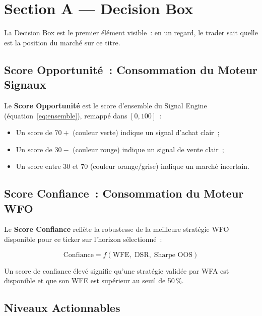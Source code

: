 \section{Section A --- Decision Box}
\label{sec:decision_box}

La Decision Box est le premier élément visible~: en un regard, le trader sait
quelle est la position du marché sur ce titre.

\subsection{Score Opportunité~: Consommation du Moteur Signaux}

Le \textbf{Score Opportunité} est le score d'ensemble du Signal Engine
(équation~\eqref{eq:ensemble}), remappé dans $[0, 100]$~:

\begin{itemize}
    \item Un score de $70+$ (couleur verte) indique un signal d'achat clair~;
    \item Un score de $30-$ (couleur rouge) indique un signal de vente clair~;
    \item Un score entre 30 et 70 (couleur orange/grise) indique un marché incertain.
\end{itemize}


\subsection{Score Confiance~: Consommation du Moteur WFO}

Le \textbf{Score Confiance} reflète la robustesse de la meilleure stratégie WFO
disponible pour ce ticker sur l'horizon sélectionné~:

\begin{equation}
\text{Confiance} = f(\text{WFE},\; \text{DSR},\; \text{Sharpe OOS})
\label{eq:confidence_score}
\end{equation}

Un score de confiance élevé signifie qu'une stratégie validée par WFA est disponible
et que son WFE est supérieur au seuil de 50\,\%.

\subsection{Niveaux Actionnables}

